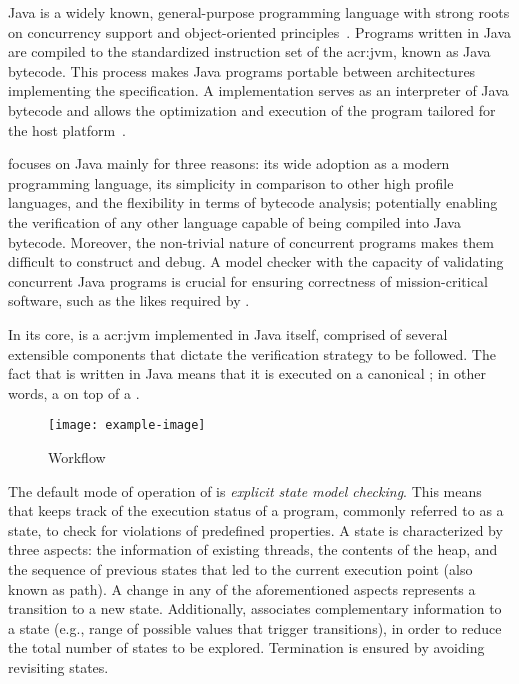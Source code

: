 Java is a widely known, general-purpose programming language with strong roots on concurrency support and object-oriented principles~\cite{Gosling2014}. Programs written in Java are compiled to the standardized instruction set of the \acrfull{acr:jvm}, known as Java bytecode. This process makes Java programs portable between architectures implementing the  specification. A  implementation serves as an interpreter of Java bytecode and allows the optimization and execution of the program tailored for the host platform~\cite{Lindholm2014}.

\jpf focuses on Java mainly for three reasons: its wide adoption as a modern programming language, its simplicity in comparison to other high profile languages, and the flexibility in terms of bytecode analysis; potentially enabling the verification of any other language capable of being compiled into Java bytecode. Moreover, the non-trivial nature of concurrent programs makes them difficult to construct and debug. A model checker with the capacity of validating concurrent Java programs is crucial for ensuring correctness of mission-critical software, such as the likes required by .

In its core, \jpf is a \acrlong{acr:jvm} implemented in Java itself, comprised of several extensible components that dictate the verification strategy to be followed. The fact that \jpf is written in Java means that it is executed on a canonical ; in other words, a  on top of a . 

\begin{figure}[t]
\centering
\texttt{[image: example-image]}
\caption[\jpf workflow]{\jpf Workflow}
\label{fig:jpf:process}
\end{figure}

The default mode of operation of \jpf is \textit{explicit state model checking}. This means that \jpf keeps track of the execution status of a program, commonly referred to as a state, to check for violations of predefined properties. A state is characterized by three aspects: the information of existing threads, the contents of the heap, and the sequence of previous states that led to the current execution point (also known as path). A change in any of the aforementioned aspects represents a transition to a new state. Additionally, \jpf associates complementary information to a state (e.g., range of possible values that trigger transitions), in order to reduce the total number of states to be explored. Termination is ensured by avoiding revisiting states.

